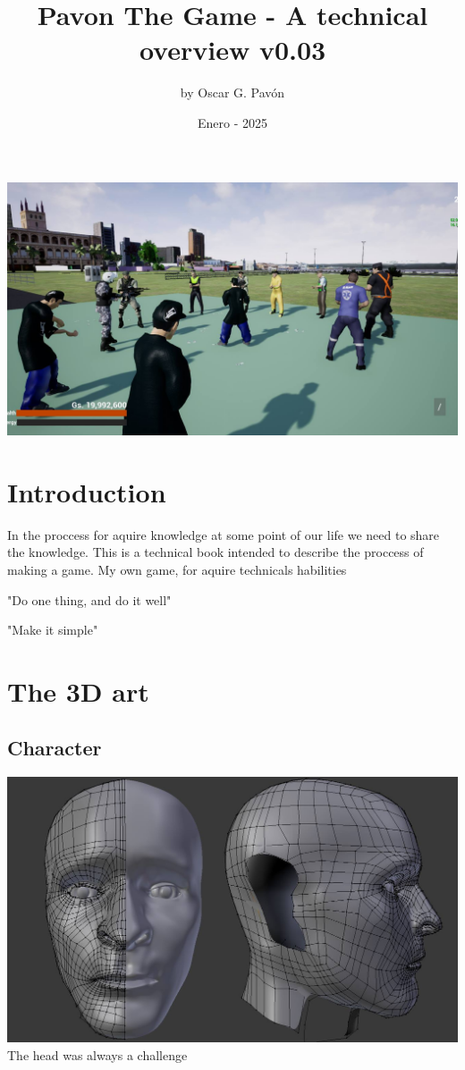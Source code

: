 \documentclass{article}
\title{Pavon The Game - A technical overview v0.03}
\date{Enero - 2025}
\author{by Oscar G. Pav\'on}
\begin{document}
  \maketitle
  

  \includegraphics[width=\textwidth]{81.jpg}


  \newpage
  \section{Introduction}
  In the proccess for aquire knowledge at some point of our life we need to share the knowledge.
  This is a technical book intended to describe the proccess of making a game. My own game, for aquire technicals habilities

  "Do one thing, and do it well"

  "Make it simple"

  \newpage
  \section{The 3D art}
  
  \subsection{Character}
  \includegraphics[width=\textwidth]{4.jpg}
  The head was always a challenge
\end{document}
